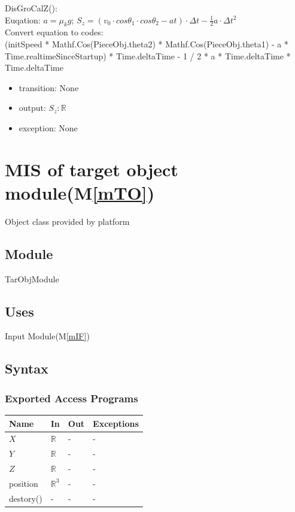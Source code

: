 \documentclass[12pt, titlepage]{article}
\newcommand{\mref}[1]{M\ref{#1}}
\begin{document}
\noindent DisGroCalZ():\\
Euqation: $a=\mu_{k}g$; $S_{z}=(v_{0}\cdot cos\theta _{1}\cdot cos\theta _{2} - at)\cdot \Delta t-\frac{1}{2}a \cdot \Delta t^{2}$\\
Convert equation to codes:\\
(initSpeed * Mathf.Cos(PieceObj.theta2) * Mathf.Cos(PieceObj.theta1) - a * Time.realtimeSinceStartup) * Time.deltaTime - 1 / 2 * a * Time.deltaTime * Time.deltaTime
\begin{itemize}
	\item transition: None
	\item output: $S_{z}: \mathbb{R}$ 
	\item exception: None 
\end{itemize}

\section{MIS of target object module(\mref{mTO})}

Object class provided by platform

\subsection{Module}

TarObjModule

\subsection{Uses}

Input Module(\mref{mIF})

\subsection{Syntax}

\subsubsection{Exported Access Programs}

\begin{center}
	\begin{tabular}{p{2cm} p{4cm} p{4cm} p{2cm}}
		\hline
		\textbf{Name} & \textbf{In} & \textbf{Out} & \textbf{Exceptions} \\
		\hline
		$X$ & $\mathbb{R}$ & - & - \\
		$Y$ & $\mathbb{R}$ & - & - \\
		$Z$ & $\mathbb{R}$ & - & - \\
		position & $\mathbb{R}^{3}$ & - & - \\
		destory() & - & - & - \\
		\hline		
	\end{tabular}
\end{center}
\end{document}
